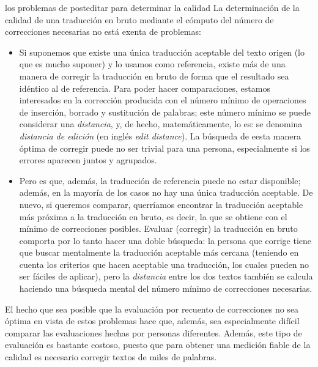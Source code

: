 \begin{persabermes}{los problemas de posteditar para determinar la calidad} La determinación de la calidad de una traducción en bruto mediante el cómputo del número de correcciones necesarias no está exenta de problemas: \begin{itemize} \item Si suponemos que existe una única traducción aceptable del texto origen (lo que es mucho suponer) y lo usamos como referencia, existe más de una manera de corregir la traducción en bruto de forma que el resultado sea idéntico al de referencia. Para poder hacer comparaciones, estamos interesados en la corrección producida con el número mínimo de operaciones de inserción, borrado y sustitución de palabras; este número mínimo se puede considerar una \emph{distancia}, y, de hecho, matemáticamente, lo es: se denomina \emph{distancia de edición} (en inglés \emph{edit distance}). La búsqueda de eesta manera óptima de corregir puede no ser trivial para una persona, especialmente si los errores aparecen juntos y agrupados. \item Pero es que, además, la traducción de referencia puede no estar disponible; además, en la mayoría de los casos no hay una única traducción aceptable. De nuevo, si queremos comparar, querríamos encontrar la traducción aceptable más próxima a la traducción en bruto, es decir, la que se obtiene con el mínimo de correcciones posibles. Evaluar (corregir) la traducción en bruto comporta por lo tanto hacer una doble búsqueda: la persona que corrige tiene que buscar mentalmente la traducción aceptable más cercana (teniendo en cuenta los criterios que hacen aceptable una traducción, los cuales pueden no ser fáciles de aplicar), pero la \emph{distancia} entre los dos textos también se calcula haciendo una búsqueda mental del número mínimo de correcciones necesarias. \end{itemize} El hecho que sea posible que la evaluación por recuento de correcciones no sea óptima en vista de estos problemas hace que, además, sea especialmente difícil comparar las evaluaciones hechas por personas diferentes. Además, este tipo de evaluación es bastante costoso, puesto que para obtener una medición fiable de la calidad es necesario corregir textos de miles de palabras. \end{persabermes} 

